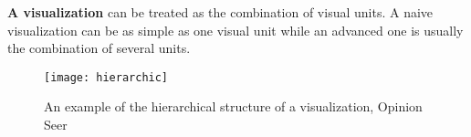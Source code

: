 \noindent
\textbf{A visualization} can be treated as the combination of visual units. A naive visualization can be as simple as one visual unit while an advanced one is usually the combination of several units. 

\begin{figure}
 \centering %
 \texttt{[image: hierarchic]}
 \caption{An example of the hierarchical structure of a visualization, Opinion Seer\cite{wu_opinionseer:_2010}}
 \label{fig:hierarchic}
\end{figure}


